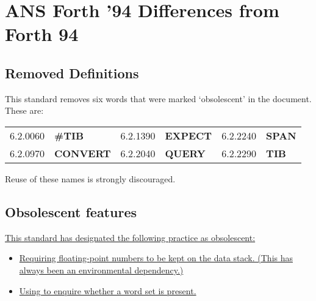
\cbstart{}
\section[Differences from Forth 94]{ANS Forth '94 Differences from Forth 94} %
\cbend
\label{diff:forth94}

\subsection{Removed Definitions} %
	This standard removes six words that were marked `obsolescent'
	in the  document.  These are:

\begin{tabular}{rl@{\qquad}rl@{\qquad}rl}
	6.2.0060	& \textbf{\#TIB}
&	6.2.1390	& \textbf{EXPECT}
&	6.2.2240	& \textbf{SPAN} \\
	6.2.0970	& \textbf{CONVERT}
&	6.2.2040	& \textbf{QUERY}
&	6.2.2290	& \textbf{TIB} \\
\end{tabular}

    Reuse of these names is strongly discouraged.

\cbstart{}
\subsection{Obsolescent features}
\label{diff:94:obsolete}

\uline{This standard has designated the following practice as obsolescent:}

\begin{itemize}
\item \uline{Requiring floating-point numbers to be kept on the data stack.
	(This has always been an environmental dependency.)}

\item \uline{Using  to enquire whether a word set is present.}
\end{itemize}
\cbend

\endinput


\makeatletter
\newcommand{\wordindex}[9][]{%
	\hyperdef{#5}{#8}{}
	\def\@currentlabel{%
			\thesubsection%
			\ifx#2\empty.0\else.#2\fi%
			\ifx#3\empty\else.#3\fi%
	}
	\edef\@currentlabelname{#4}
	\def\@currentHref{#5.#8}
	\label{#5:#8}
	\immediate\write\wordfile{\string\indexentry%
		\ifx#1\empty\else *\fi%
		{\thesubsection}%
		{#2}%
		{#3}%
		{#4}%
		{#5}%
		{#6}%
		{#7}%
		{#8}%
		{#9}%
	}
}
\makeatother

